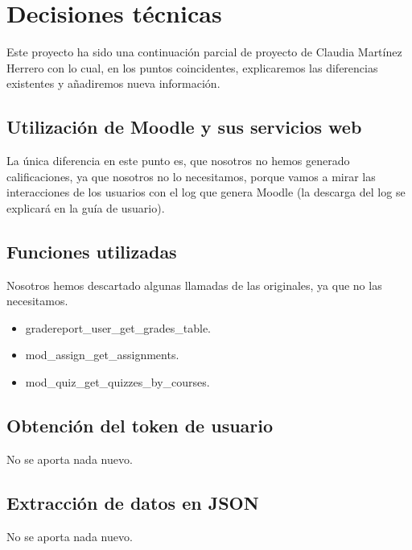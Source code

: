 \section{Decisiones técnicas}\label{decisiones-tecnicas}

Este proyecto ha sido una continuación parcial de proyecto de Claudia Martínez Herrero \cite{claudia} con lo cual, en los puntos coincidentes, explicaremos las diferencias existentes y añadiremos nueva información.

\subsection{Utilización de Moodle y sus servicios web}\label{utilizacióndemoodleysusserviciosweb}

La única diferencia en este punto es, que nosotros no hemos generado calificaciones, ya que nosotros no lo necesitamos, porque vamos a mirar las interacciones de los usuarios con el log que genera Moodle (la descarga del log se explicará en la guía de usuario).

\subsection{Funciones utilizadas}\label{funciones-utilizadas}

Nosotros hemos descartado algunas llamadas de las originales, ya que no las necesitamos.

\begin{itemize}
	\tightlist
	\item
	gradereport\_user\_get\_grades\_table.
	\item
	mod\_assign\_get\_assignments.
	\item
	mod\_quiz\_get\_quizzes\_by\_courses.
\end{itemize}

\subsection{Obtención del token de usuario}\label{obtención-del-token-de-usuario}

No se aporta nada nuevo.

\subsection{Extracción de datos en JSON}\label{extracción-de-datos-en-json}

No se aporta nada nuevo.

